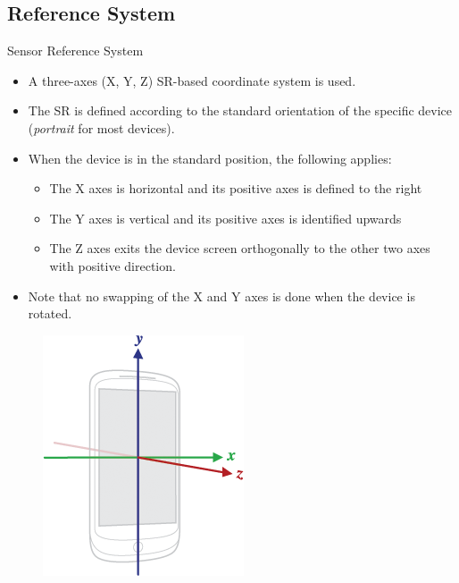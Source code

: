 \documentclass{beamer}
\begin{document}
\subsection{Reference System}
  \begin{frame}[allowframebreaks]{Sensor Reference System}
    \begin{itemize}\itemsep10pt
      \item A three-axes (X, Y, Z) SR-based coordinate system is used.
      \item The SR is defined according to the standard orientation of the
      specific device (\textit{portrait} for most devices).
      \item When the device is in the standard position, the following applies:
      \begin{itemize}
        \item The X axes is horizontal and its positive axes is defined to the
        right
        \item The Y axes is vertical and its positive axes is identified upwards
        \item The Z axes exits the device screen orthogonally to the other two
        axes with positive direction.
      \end{itemize}
      \item Note that no swapping of the X and Y axes is done when the device is
      rotated. 
    \end{itemize}

    \begin{figure}
      \includegraphics[width=0.5\linewidth]{figures/axes_device.png}
    \end{figure}


\end{frame}
\end{document}
